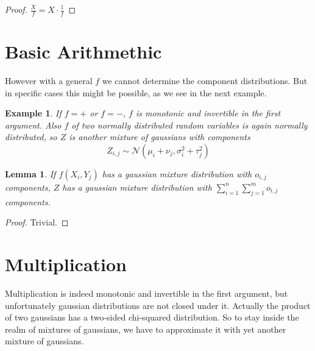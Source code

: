 \documentclass[11pt,a4paper]{book}
\newtheorem{lemma}{Lemma}
\newtheorem{example}{Example}
\begin{document}
\begin{proof}
  $\frac{X}{f} = X \cdot \frac{1}{f}$
\end{proof}

\section{Basic Arithmethic}

However with a general $f$ we cannot determine the component distributions. But
in specific cases this might be possible, as we see in the next example.

\begin{example}
  If $f = +$ or $f = -$, $f$ is monotonic and invertible in the first
  argument. Also $f$ of two normally distributed random variables is again
  normally distributed, so $Z$ is another mixture of gaussians with components
  \begin{equation*}
    Z_{i,j} \sim \mathcal{N}(\mu_{i} + \nu_{j}, \sigma_{i}^{2} + \tau_{j}^{2})
  \end{equation*}
\end{example}

\begin{lemma}
  If $f(X_{i}, Y_{j})$ has a gaussian mixture distribution with $o_{i,j}$
  components, $Z$ has a gaussian mixture distribution with
  $\sum_{i = 1}^{n} \sum_{j = 1}^{m} o_{i,j}$ components.
\end{lemma}

\begin{proof}
  Trivial.
\end{proof}

\section{Multiplication}

Multiplication is indeed monotonic and invertible in the first argument, but
unfortunately gaussian distributions are not closed under it. Actually the
product of two gaussians has a two-sided chi-squared distribution. So to stay
inside the realm of mixtures of gaussians, we have to approximate it with yet
another mixture of gaussians.
\end{document}
